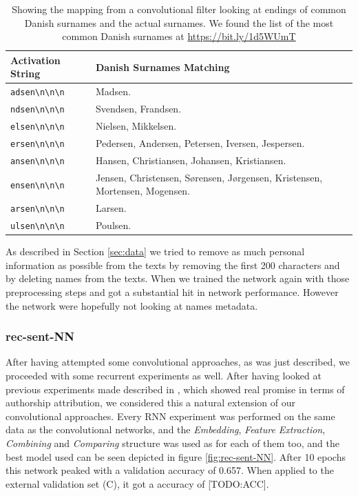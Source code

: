 \begin{table}
    \begin{tabular}{ll}
        \textbf{Activation String} & \textbf{Danish Surnames Matching} \\
        \hline
        \verb!adsen\n\n\n! & Madsen. \\
        \verb!ndsen\n\n\n! & Svendsen, Frandsen. \\
        \verb!elsen\n\n\n! & Nielsen, Mikkelsen. \\
        \verb!ersen\n\n\n! & Pedersen, Andersen, Petersen, Iversen, Jespersen. \\
        \verb!ansen\n\n\n! & Hansen, Christiansen, Johansen, Kristiansen. \\
        \verb!ensen\n\n\n! & Jensen, Christensen, S\o rensen, J\o rgensen, Kristensen,
                             Mortensen, Mogensen. \\
        \verb!arsen\n\n\n! & Larsen. \\
        \verb!ulsen\n\n\n! & Poulsen.
    \end{tabular}
    \caption{Showing the mapping from a convolutional filter looking at endings
        of common Danish surnames and the actual surnames. We found the list of
        the most common Danish surnames at \url{https://bit.ly/1d5WUmT}}
    \label{tab:name_features}
\end{table}

As described in Section \ref{sec:data} we tried to remove as much personal
information as possible from the texts by removing the first 200 characters
and by deleting names from the texts. When we trained the network again with
those preprocessing steps and got a substantial hit in network performance.
However the network were hopefully not looking at names metadata.


\subsubsection{\glsdesc{rec-sent-NN}}
\label{subsubsec:rec_sent_nn}

After having attempted some convolutional approaches, as was just described,
we proceeded with some recurrent experiments as well. After having looked at
previous experiments made described in \cite{qian:2018}, which showed real
promise in terms of authorship attribution, we considered this a natural
extension of our convolutional approaches. Every \gls{RNN} experiment
was performed on the same data as the convolutional networks, and the
\textit{Embedding}, \textit{Feature Extraction}, \textit{Combining} and
\textit{Comparing} structure was used as for each of them too, and the best
model used can be seen depicted in figure \ref{fig:rec-sent-NN}. After
10 epochs this network peaked with a validation accuracy of
0.657. When applied to the external validation set (C), it got a accuracy
of [TODO:ACC].

